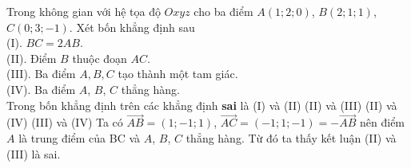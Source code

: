 \begin{ex}%
	Trong không gian với hệ tọa độ $Oxyz$ cho ba điểm $A(1;2;0)$, $B(2;1;1)$, $C(0;3;-1)$. Xét bốn khẳng định sau\\
	(I). $BC=2AB$.\\
	(II). Điểm $B$ thuộc đoạn $AC$.\\
	(III). Ba điểm $A,B,C$ tạo thành một tam giác.\\
	(IV). Ba điểm $A$, $B$, $C$ thẳng hàng.\\
	Trong bốn khẳng định trên các khẳng định \textbf{sai} là	
	\choice
	{(I) và (II)}
	{\True (II) và (III)}
	{(II) và (IV)}
	{(III) và (IV)}
	\loigiai
	{
		Ta có $\overrightarrow{AB}=(1;-1;1)$, $\overrightarrow{AC}=(-1;1;-1)=-\overrightarrow{AB}$ nên điểm $A$ là trung điểm của BC và $A$, $B$, $C$ thẳng hàng. Từ đó ta thấy kết luận (II) và (III) là sai.
	}
\end{ex}

